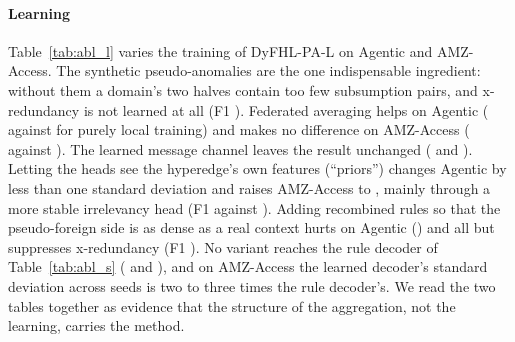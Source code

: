 \documentclass[preprint,12pt]{elsarticle}
\theoremstyle{definition}
\newcommand{\name}{DyFHL-PA\xspace}
\newcommand{\R}{\textsc{r}}
\begin{document}
\begin{table}[t]
\caption{Structural ablation of \name-\R{} ($B=512$): macro-F1 per benchmark (mean $\pm$ std, three seeds) and F1 per task averaged over benchmarks.}
\label{tab:abl_s}
\centering\scriptsize
\setlength{\tabcolsep}{3pt}
\end{table}

\paragraph{Learning} Table~\ref{tab:abl_l} varies the training of \name-L on Agentic and AMZ-Access. The synthetic pseudo-anomalies are the one indispensable ingredient: without them a domain's two halves contain too few subsumption pairs, and x-redundancy is not learned at all (F1 \ablleapseudoanomalyared). Federated averaging helps on Agentic (\ablleafulllearneddecagentic{} against \ablleaFedAvglocaltraagentic{} for purely local training) and makes no difference on AMZ-Access (\ablleafulllearneddecamazon{} against \ablleaFedAvglocaltraamazon). The learned message channel leaves the result unchanged (\abllealearnedmessageagentic{} and \abllealearnedmessageamazon). Letting the heads see the hyperedge's own features (``priors'') changes Agentic by less than one standard deviation and raises AMZ-Access to \ablleahyperedgeprioramazon, mainly through a more stable irrelevancy head (F1 \ablleahyperedgepriorirr{} against \ablleafulllearneddecirr). Adding recombined rules so that the pseudo-foreign side is as dense as a real context hurts on Agentic (\ablleadensitymatchinagentic) and all but suppresses x-redundancy (F1 \ablleadensitymatchinred). No variant reaches the rule decoder of Table~\ref{tab:abl_s} (\ablstrfullagentic{} and \ablstrfullamazon), and on AMZ-Access the learned decoder's standard deviation across seeds is two to three times the rule decoder's. We read the two tables together as evidence that the structure of the aggregation, not the learning, carries the method.
\end{document}
